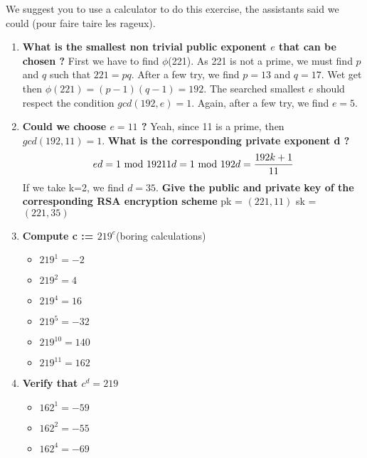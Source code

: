 \begin{solution}
We suggest you to use a calculator to do this exercise, the assistants said we could (pour faire taire les rageux).
  \begin{enumerate}
      \item \textbf{What is the smallest non trivial public exponent $e$ that can be chosen ?} \newline \newline
      First we have to find $\phi$(221). As 221 is not a prime, we must find $p$ and $q$ such that $221 = pq$. After a few try, we find $p = 13$ and $q = 17$. Wet get then $\phi(221) = (p-1)(q-1) = 192$. \newline 
      The searched smallest $e$ should respect the condition $gcd(192, e) = 1$. Again, after a few try, we find $e = 5$.
      \item \textbf{Could we choose $e = 11$ ?} Yeah, since 11 is a prime, then $gcd(192, 11) = 1$. \newline \newline
      \textbf{What is the corresponding private exponent d ?} $$ ed = 1 \text{ mod 192} \\ 11d = 1 \text{ mod 192} \\ d = \frac{192k + 1}{11}$$
      If we take k=2, we find $d = 35$.\newline \newline
      \textbf{Give the public and private key of the corresponding RSA encryption scheme} \newline
      pk = $(221, 11)$ 
      sk = $(221, 35)$
      \item \textbf{Compute c := $219^e$}(boring calculations) 
      \begin{itemize}
          \item $219^{1} = -2 $
          \item $219^{2} = 4  $
          \item $219^{4} = 16 $
          \item $219^{5} = -32$
          \item $219^{10} = 140$
          \item $219^{11} = 162$
      \end{itemize}
      \item \textbf{Verify that $c^d = 219$} 
      \begin{itemize}
          \item $162^{1} = -59 $
          \item $162^{2} = -55 $
          \item $162^{4} = -69 $

\end{itemize}
\end{enumerate}
\end{solution}
